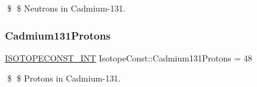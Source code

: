 \$ \$ Neutrons in Cadmium-\/131. \mbox{\label{group___isotope_const-_cadmium-_cd131_ga8992b7f357d3c2e9ec0b6494c8e1e621}} 
\subsubsection{\texorpdfstring{Cadmium131\+Protons}{Cadmium131Protons}}
{\footnotesize\ttfamily \mbox{\hyperlink{group___isotope_const-_macros_ga5f18360b3e99483a35c32d789e62621c}{I\+S\+O\+T\+O\+P\+E\+C\+O\+N\+S\+T\+\_\+\+I\+NT}} Isotope\+Const\+::\+Cadmium131\+Protons = 48}

\$ \$ Protons in Cadmium-\/131. 